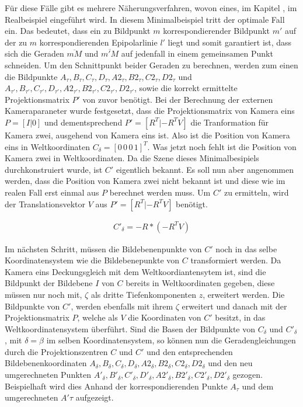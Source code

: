 Für diese Fälle gibt es mehrere Näherungsverfahren, wovon eines, im Kapitel , im Realbeispiel eingeführt wird\cite{HZ}. In diesem Minimalbeispiel tritt der optimale Fall ein. Das bedeutet, dass ein zu Bildpunkt $m$ korrespondierender Bildpunkt $m'$ auf der zu $m$ korrespondierenden Epipolarlinie $l'$ liegt und somit garantiert ist, dass sich die Geraden $\overline{mM}$ und $\overline{m'M}$ auf jedenfall in einem gemeinsamen Punkt schneiden. Um den Schnittpunkt beider Geraden zu berechnen, werden zum einen die Bildpunkte  $A_\tau,B_\tau,C_\tau,D_\tau,A2_\tau,B2_\tau,C2_\tau,D2_\tau$ und $A_{\tau'},B_{\tau'},C_{\tau'},D_{\tau'},A2_{\tau'},B2_{\tau'},C2_{\tau'},D2_{\tau'}$, sowie die korrekt ermittelte Projektionsmatrix $P'$ von zuvor benötigt. Bei der Berechnung der externen Kameraparaneter wurde festgesetzt, dass die Projektionsmatrix von Kamera eins $P = [I|0]$ und dementsprechend $P' = [R^T|-R^TV]$ die Tranformation für Kamera zwei, ausgehend von Kamera eins ist. Also ist die Position von Kamera eins in Weltkoordinaten $C_\delta = [0 \, 0 \, 0 \, 1]^T$. Was jetzt noch fehlt ist die Position von Kamera zwei in Weltkoordinaten. Da die Szene dieses Minimalbesipiels durchkonstruiert wurde, ist $C'$ eigentlich bekannt. Es soll nun aber angenommen werden, dass die Position von Kamera zwei nicht bekannt ist und diese wie im realen Fall erst einmal aus $P$ berechnet werden muss. Um $C'$ zu ermitteln, wird der Translationsvektor $V$ aus  $P' = [R^T|-R^TV]$ benötigt. 

\begin{gather}
	C'_\delta = - R* (-R^TV)
\end{gather}

Im nächsten Schritt, müssen die Bildebenenpunkte von $C'$ noch in das selbe Koordinatensystem wie die Bildebenepunkte von $C$ transformiert werden. Da Kamera eins Deckungsgleich mit dem Weltkoordiantensytem ist, sind die Bildpunkt der Bildebene $I$ von $C$ bereits in Weltkoordinaten gegeben, diese müssen nur noch mit, $\zeta$ als dritte Tiefenkomponenten $z$, erweitert werden. Die Bildpunkte von $C'$, werden ebenfalls mit ihrem $\zeta$ erweitert und danach mit der Projektionsmatrix $P$, welche als $V$ die Koordinaten von $C'$ besitzt, in das Weltkoordinatensystem überführt. 
Sind die Basen der Bildpunkte von $C_\delta$ und $C'_\delta$, mit $\delta = \beta$ im selben Koordinatensystem, so können nun die Geradengleichungen durch die Projektionszentren $C$ und $C'$ und den entsprechenden Bildebenenkoordinaten $A_\delta,B_\delta,C_\delta,D_\delta,A2_\delta,B2_\delta,C2_\delta,D2_\delta$ und den neu umgerechneten Punkten $A'_\delta,B'_\delta,C'_\delta,D'_\delta,A2'_\delta,B2'_\delta,C2'_\delta,D2'_\delta$ gezogen. Beispielhaft wird dies Anhand der korrespondierenden Punkte $A_\tau$ und dem umgerechneten $A'\tau$ aufgezeigt.

